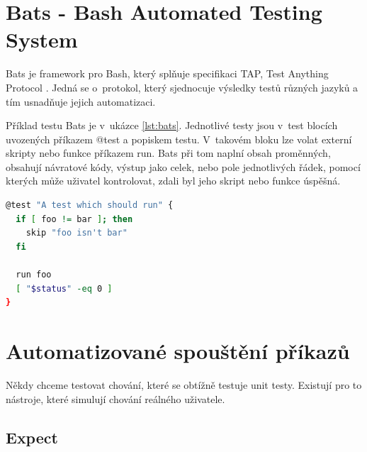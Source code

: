 \documentclass[thesis=M,czech]{FITthesis}[2012/06/26]
\begin{document}


\section{Bats - Bash Automated Testing System}
Bats \cite{bats} je framework pro Bash, který splňuje specifikaci TAP, Test Anything Protocol \cite{tap}. Jedná se o~protokol, který sjednocuje výsledky testů různých jazyků a tím usnadňuje jejich automatizaci.

Příklad testu Bats je v~ukázce \ref{lst:bats}. Jednotlivé testy jsou v~test blocích uvozených příkazem @test a popiskem testu. V~takovém bloku lze volat externí skripty nebo funkce příkazem run. Bats při tom naplní obsah proměnných, obsahují návratové kódy, výstup jako celek, nebo pole jednotlivých řádek, pomocí kterých může uživatel kontrolovat, zdali byl jeho skript nebo funkce úspěšná.

\begin{minipage}{\linewidth}
\begin{lstlisting}[language=bash, caption={Bats}, label={lst:bats}]
@test "A test which should run" {
  if [ foo != bar ]; then
    skip "foo isn't bar"
  fi

  run foo
  [ "$status" -eq 0 ]
}
\end{lstlisting}
\end{minipage}




%
\section{Automatizované spouštění příkazů}

Někdy chceme testovat chování, které se obtížně testuje unit testy. Existují pro to nástroje, které simulují chování reálného uživatele.


\subsection{Expect}
\end{document}
